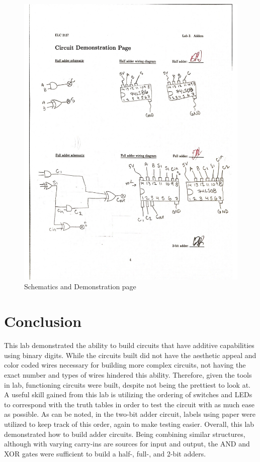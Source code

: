 \documentclass[11pt]{article}
\begin{document}
\begin{figure}
	\includegraphics[width=1.0\textwidth]{"Circuit D"}
	\caption{Schematics and Demonstration page}
\end{figure}


\clearpage

\section*{Conclusion}

This lab demonstrated the ability to build circuits that have additive capabilities using binary digits. While the circuits built did not have the aesthetic appeal and color coded wires necessary for building more complex circuits, not having the exact number and types of wires hindered this ability. Therefore, given the tools in lab, functioning circuits were built, despite not being the prettiest to look at. A useful skill gained from this lab is utilizing the ordering of switches and LEDs to correspond with the truth tables in order to test the circuit with as much ease as possible. As can be noted, in the two-bit adder circuit, labels using paper were utilized to keep track of this order, again to make testing easier. Overall, this lab demonstrated how to build adder circuits. Being combining similar structures, although with varying carry-ins are sources for input and output, the AND and XOR gates were sufficient to build a half-, full-, and 2-bit adders.
\end{document}
